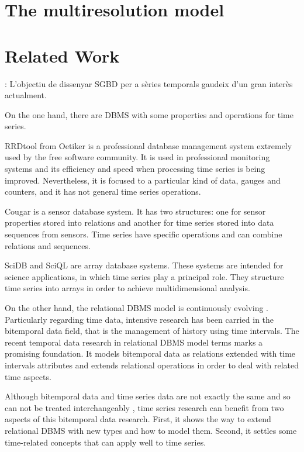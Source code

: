\documentclass{scrartcl}
\begin{document}
\section{The multiresolution model}









\section{Related Work}


: L'objectiu de dissenyar SGBD per a sèries temporals gaudeix d'un gran interès actualment.

On the one hand, there are DBMS with some properties and operations
for time series.

RRDtool from Oetiker \cite{rrdtool} is a professional database
management system extremely used by the free software community. It is
used in professional monitoring systems and its efficiency and speed
when processing time series is being improved. Nevertheless, it is
focused to a particular kind of data, gauges and counters, and it has
not general time series operations.

Cougar \cite{bonnet01} is a sensor database system. It has two
structures: one for sensor properties stored into relations and
another for time series stored into data sequences from sensors.  Time
series have specific operations and can combine relations and
sequences.


SciDB \cite{stonebraker09:scidb} and SciQL \cite{zhang11} are array
database systems. These systems are intended for science applications,
in which time series play a principal role. They structure time series
into arrays in order to achieve multidimensional analysis.



On the other hand, the relational DBMS model is continuously evolving
. Particularly regarding time data,
intensive research has been carried in the bitemporal data field, that
is the management of history using time intervals.  The recent
temporal data research in relational DBMS model terms
\cite{date02:_tempor_data_relat_model} marks a promising
foundation. It models bitemporal data as relations extended with time
intervals attributes and extends relational operations in order to
deal with related time aspects.

Although bitemporal data and time series data are not exactly the same
and so can not be treated interchangeably ,
time series research can benefit from two aspects of this bitemporal
data research. First, it shows the way to extend relational DBMS with
new types and how to model them. Second, it settles some time-related
concepts that can apply well to time series.
\end{document}
